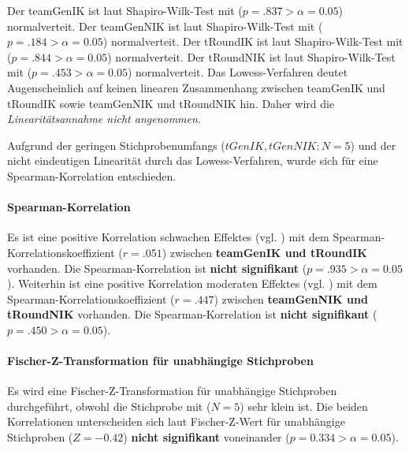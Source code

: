 \documentclass[a4paper,11pt]{article}%
\renewcommand{\\}{\vspace*{0.5\baselineskip} \newline}
\begin{document}
%
Der \ac{teamGenIK} ist laut Shapiro-Wilk-Test mit ($p = .837 > \alpha = 0.05$) normalverteit. \newline
Der \ac{teamGenNIK} ist laut Shapiro-Wilk-Test mit ($p = .184 > \alpha = 0.05$) normalverteit. \newline
Der \ac{tRoundIK} ist laut Shapiro-Wilk-Test mit ($p = .844 > \alpha = 0.05$) normalverteit. \newline
Der \ac{tRoundNIK} ist laut Shapiro-Wilk-Test mit ($p = .453 > \alpha = 0.05$) normalverteit. \\
Das Lowess-Verfahren deutet Augenscheinlich auf keinen linearen Zusammenhang zwischen \ac{teamGenIK} und \ac{tRoundIK} sowie \ac{teamGenNIK} und \ac{tRoundNIK} hin. Daher wird die \textit{Linearitätsannahme nicht angenommen}.

Aufgrund der geringen Stichprobenumfangs ($tGenIK, tGenNIK : N=5$) und der nicht eindeutigen Linearität durch das Lowess-Verfahren, wurde sich für eine Spearman-Korrelation entschieden.

\paragraph{Spearman-Korrelation}
Es ist eine positive Korrelation schwachen Effektes (vgl. \cite{cohen2013statistical}) mit dem Spearman-Korrelationskoeffizient ($r = .051$) zwischen \textbf{\ac{teamGenIK} und \ac{tRoundIK}} vorhanden. Die Spearman-Korrelation ist \textbf{nicht signifikant} ($p = .935 > \alpha = 0.05$).\\
Weiterhin ist eine positive Korrelation moderaten Effektes (vgl. \cite{cohen2013statistical}) mit dem Spearman-Korrelationskoeffizient ($r = .447$) zwischen \textbf{\ac{teamGenNIK} und \ac{tRoundNIK}} vorhanden. Die Spearman-Korrelation ist \textbf{nicht signifikant} ($p = .450 > \alpha = 0.05$).

\paragraph{Fischer-Z-Transformation für unabhängige Stichproben}
Es wird eine Fischer-Z-Transformation für unabhängige Stichproben durchgeführt, obwohl die Stichprobe mit ($N=5$) sehr klein ist.
Die beiden Korrelationen unterscheiden sich laut Fischer-Z-Wert für unabhängige Stichproben ($Z=-0.42$) \textbf{nicht signifikant} voneinander ($p = 0.334 > \alpha = 0.05$).
\end{document}
